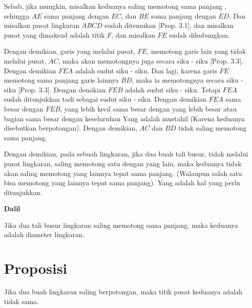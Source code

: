 \documentclass[a4paper]{book}
\begin{document}
Sebab, jika mungkin, misalkan keduanya saling memotong sama panjang , sehingga $AE$
sama panjang dengan $EC$, dan $BE$ sama panjang dengan $ED$. Dan misalkan 
pusat lingkaran $ABCD$ sudah ditemukan [Prop. 3.1], dan misalkan pusat yang
dimaksud adalah titik $F$, dan misalkan $FE$ sudah dihubungkan.

Dengan demikian, garis yang melalui pusat, $FE$, memotong garis lain yang
tidak melalui pusat, $AC$, maka akan memotongnya juga secara siku - siku 
[Prop. 3.3]. Dengan demikian $FEA$ adalah sudut siku - siku. Dan lagi, karena
garis $FE$ memotong sama panjang garis lainnya $BD$, maka ia memotongnya secara
siku - siku [Prop. 3.3]. Dengan demikian $FEB$ adalah sudut siku - siku. 
Tetapi $FEA$ sudah ditunjukkan tadi sebagai sudut siku - siku. Dengan demikian
$FEA$ sama besar dengan $FEB$, yang lebih kecil sama besar dengan yang
lebih besar atau bagian sama besar dengan keseluruhan
Yang adalah mustahil (Karena keduanya disebutkan berpotongan).
 Dengan demikian, $AC$ dan $BD$ tidak saling memotong sama panjang.

Dengan demikian, pada sebuah lingkaran, jika dua buah tali busur, tidak 
melalui pusat lingkaran,
saling memotong satu dengan yang lain, maka keduanya tidak akan saling memotong 
yang lainnya tepat sama panjang. (Walaupun salah satu bisa memotong yang lainnya 
tepat sama panjang).  Yang adalah hal yang perlu ditunjukkan.  

\begin{center}
\textbf{Dalil}
\end{center}
Jika dua tali busur lingkaran saling memotong sama panjang, maka keduanya adalah 
diameter lingkaran.

\section*{\centering Proposisi \thesection}
Jika dua buah lingkaran saling berpotongan, maka titik pusat keduanya adalah  
tidak sama.
\begin{center}
\end{center}
\end{document}

